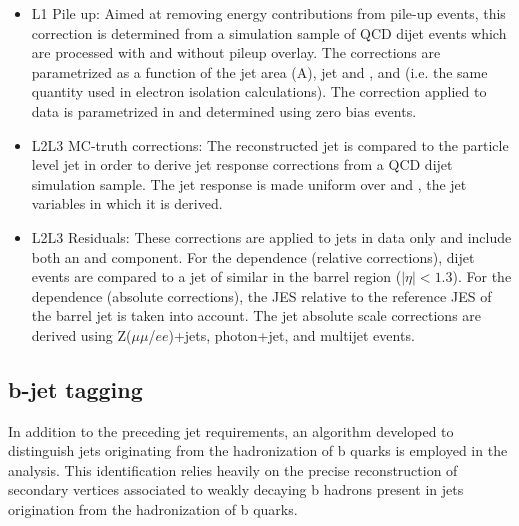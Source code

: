 \begin{itemize}
  \item L1 Pile up: Aimed at removing energy contributions from pile-up events, this correction is determined from a simulation sample of QCD dijet events which are processed with and without pileup overlay. The corrections are parametrized as a function of the jet area (A), jet \eta and \pt, and \rho (i.e. the same quantity used in electron isolation calculations). The correction applied to data is parametrized in \eta and determined using zero bias events.
  \item L2L3 MC-truth corrections: The reconstructed jet \pt is compared to the particle level jet \pt in order to derive jet response corrections from a QCD dijet simulation sample. The jet response is made uniform over \pt and \eta, the jet variables in which it is derived.
  \item L2L3 Residuals: These corrections are applied to jets in data only and include both an \eta and \pt component. For the \eta dependence (relative corrections), dijet events are compared to a jet of similar \pt in the barrel region ($|\eta|<1.3$). For the \pt dependence (absolute corrections), the JES relative to the reference JES of the barrel jet is taken into account. The jet absolute scale corrections are derived using Z($\mu\mu$/$ee$)+jets, photon+jet, and multijet events.
\end{itemize}

\subsection{b-jet tagging}
\label{subsec:btag}
In addition to the preceding jet requirements, an algorithm developed to distinguish jets originating from the hadronization of b quarks is employed in the analysis. This identification relies heavily on the precise reconstruction of secondary vertices associated to weakly decaying b hadrons present in jets origination from the hadronization of b quarks.

